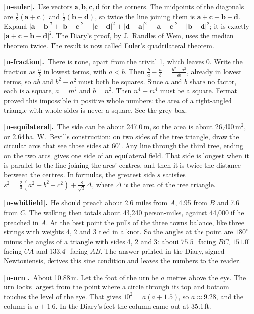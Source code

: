\documentclass[11pt,a4paper]{article}
\newcommand{\ans}[2]{\par\smallskip\noindent\textbf{\ref{#1}.}\ #2}
\begin{document}
\ans{u-euler}{Use vectors $\mathbf a, \mathbf b, \mathbf c, \mathbf d$ for the corners.
The midpoints of the diagonals are $\tfrac12(\mathbf a + \mathbf c)$ and
$\tfrac12(\mathbf b + \mathbf d)$, so twice the line joining them is
$\mathbf a + \mathbf c - \mathbf b - \mathbf d$. Expand
$|\mathbf a - \mathbf b|^2 + |\mathbf b - \mathbf c|^2 + |\mathbf c - \mathbf d|^2 +
|\mathbf d - \mathbf a|^2 - |\mathbf a - \mathbf c|^2 - |\mathbf b - \mathbf d|^2$; it is
exactly $|\mathbf a + \mathbf c - \mathbf b - \mathbf d|^2$. The Diary's proof, by
J.~Randles of Wem, uses the median theorem twice. The result is now called Euler's
quadrilateral theorem.}
\ans{u-fraction}{There is none, apart from the trivial 1, which leaves 0. Write the
fraction as $\tfrac ab$ in lowest terms, with $a < b$. Then $\tfrac ba - \tfrac ab =
\tfrac{b^2 - a^2}{ab}$, already in lowest terms, so $ab$ and $b^2 - a^2$ must both be
squares. Since $a$ and $b$ share no factor, each is a square, $a = m^2$ and $b = n^2$.
Then $n^4 - m^4$ must be a square. Fermat proved this impossible in positive whole
numbers: the area of a right-angled triangle with whole sides is never a square. See
the grey box.}
\ans{u-equilateral}{The side can be about 247.0\,m, so the area is about
26,400\,m$^2$, or 2.64\,ha. W.~Bevil's construction: on two sides of the tree triangle,
draw the circular arcs that see those sides at $60^\circ$. Any line through the third
tree, ending on the two arcs, gives one side of an equilateral field. That side is
longest when it is parallel to the line joining the arcs' centres, and then it is
twice the distance between the centres. In formulas, the greatest side $s$ satisfies
$s^2 = \tfrac23(a^2 + b^2 + c^2) + \tfrac8{\sqrt3}\Delta$, where $\Delta$ is the area of
the tree triangle.}
\ans{u-whitfield}{He should preach about 2.6 miles from $A$, 4.95 from $B$ and 7.6 from
$C$. The walking then totals about 43,240 person-miles, against 44,000 if he preached in
$A$. At the best point the pulls of the three towns balance, like three strings with
weights 4, 2 and 3 tied in a knot. So the angles at the point are $180^\circ$ minus the
angles of a triangle with sides 4, 2 and 3: about $75.5^\circ$ facing $BC$, $151.0^\circ$
facing $CA$ and $133.4^\circ$ facing $AB$. The answer printed in the Diary, signed
Newtoniensis, derives this sine condition and leaves the numbers to the reader.}
\ans{u-urn}{About 10.88\,m. Let the foot of the urn be $a$ metres above the eye. The urn
looks largest from the point where a circle through its top and bottom touches the
level of the eye. That gives $10^2 = a(a + 1.5)$, so $a \approx 9.28$, and the column is
$a + 1.6$. In the Diary's feet the column came out at 35.1\,ft.}
\end{document}
